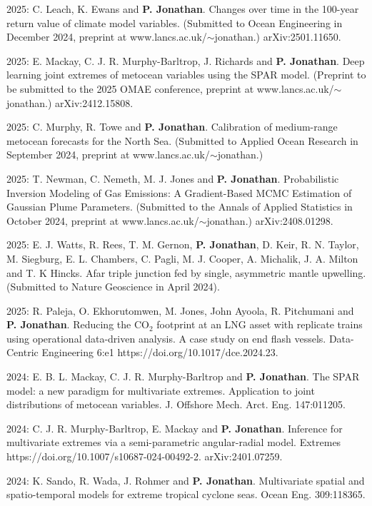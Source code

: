 \documentclass[11pt,a4paper]{moderncv}
\begin{document}
2025: C. Leach, K. Ewans and \textbf{P. Jonathan}. Changes over time in the 100-year return value of climate model variables. (Submitted to Ocean Engineering in December 2024, preprint at www.lancs.ac.uk/$\sim$jonathan.) arXiv:2501.11650.

2025: E. Mackay, C. J. R. Murphy-Barltrop, J. Richards and \textbf{P. Jonathan}. Deep learning joint extremes of metocean variables using the SPAR model. (Preprint to be submitted to the 2025 OMAE conference, preprint at www.lancs.ac.uk/$\sim$jonathan.) arXiv:2412.15808.

2025: C. Murphy, R. Towe and \textbf{P. Jonathan}. Calibration of medium-range metocean forecasts for the North Sea. (Submitted to Applied Ocean Research in September 2024, preprint at www.lancs.ac.uk/$\sim$jonathan.)

2025: T. Newman, C. Nemeth, M. J. Jones and \textbf{P. Jonathan}. Probabilistic Inversion Modeling of Gas Emissions: A Gradient-Based MCMC Estimation of Gaussian Plume Parameters. (Submitted to the Annals of Applied Statistics in October 2024, preprint at www.lancs.ac.uk/$\sim$jonathan.) arXiv:2408.01298.

2025: E. J. Watts, R. Rees, T. M. Gernon, \textbf{P. Jonathan}, D. Keir, R. N. Taylor, M. Siegburg, E. L. Chambers, C. Pagli, M. J. Cooper, A. Michalik, J. A. Milton and T. K Hincks. Afar triple junction fed by single, asymmetric mantle upwelling. (Submitted to Nature Geoscience in April 2024).

2025: R. Paleja, O. Ekhorutomwen, M. Jones, John Ayoola, R. Pitchumani and \textbf{P. Jonathan}. Reducing the CO$_2$ footprint at an LNG asset with replicate trains using operational data-driven analysis. A case study on end flash vessels. Data-Centric Engineering 6:e1 https://doi.org/10.1017/dce.2024.23.

2024: E. B. L. Mackay, C. J. R. Murphy-Barltrop and \textbf{P. Jonathan}. The SPAR model: a new paradigm for multivariate extremes. Application to joint distributions of metocean variables. J. Offshore Mech. Arct. Eng. 147:011205.

2024: C. J. R. Murphy-Barltrop, E. Mackay and \textbf{P. Jonathan}. Inference for multivariate extremes via a semi-parametric angular-radial model. Extremes https://doi.org/10.1007/s10687-024-00492-2.  arXiv:2401.07259.

2024: K. Sando, R. Wada, J. Rohmer and \textbf{P. Jonathan}. Multivariate spatial and spatio-temporal models for extreme tropical cyclone seas. Ocean Eng. 309:118365. 
\end{document}
